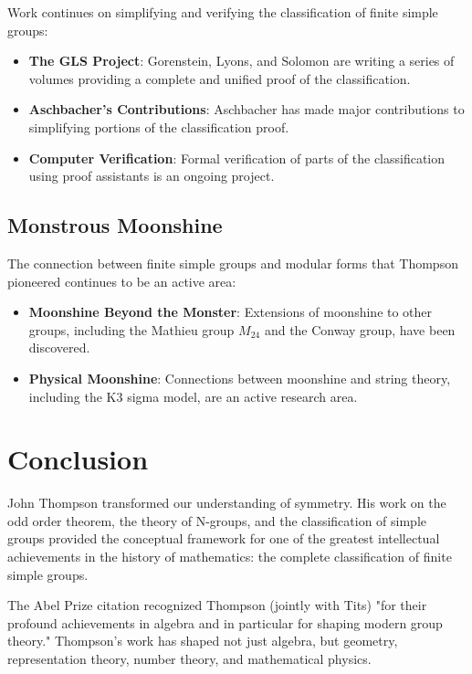 Work continues on simplifying and verifying the classification of finite simple groups:

\begin{itemize}
\item \textbf{The GLS Project}: Gorenstein, Lyons, and Solomon are writing a series of volumes providing a complete and unified proof of the classification.

\item \textbf{Aschbacher's Contributions}: Aschbacher has made major contributions to simplifying portions of the classification proof.

\item \textbf{Computer Verification}: Formal verification of parts of the classification using proof assistants is an ongoing project.
\end{itemize}

\subsection{Monstrous Moonshine}

The connection between finite simple groups and modular forms that Thompson pioneered continues to be an active area:

\begin{itemize}
\item \textbf{Moonshine Beyond the Monster}: Extensions of moonshine to other groups, including the Mathieu group $M_{24}$ and the Conway group, have been discovered.

\item \textbf{Physical Moonshine}: Connections between moonshine and string theory, including the K3 sigma model, are an active research area.
\end{itemize}

\section{Conclusion}

John Thompson transformed our understanding of symmetry. His work on the odd order theorem, the theory of N-groups, and the classification of simple groups provided the conceptual framework for one of the greatest intellectual achievements in the history of mathematics: the complete classification of finite simple groups.

The Abel Prize citation recognized Thompson (jointly with Tits) "for their profound achievements in algebra and in particular for shaping modern group theory." Thompson's work has shaped not just algebra, but geometry, representation theory, number theory, and mathematical physics.


